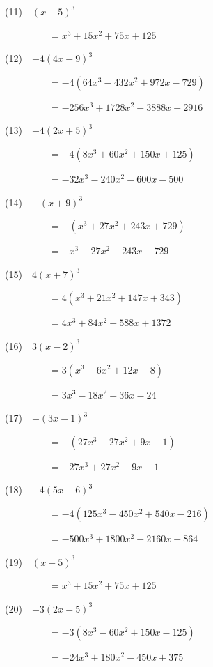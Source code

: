 \documentclass[a4j,twocolumn,10pt,fleqn]{jarticle}
\begin{document}
(11)~~$\left(x + 5\right)^{3}$

~~~~~~~~~$=x^{3} + 15 x^{2} + 75 x + 125$

(12)~~$-4\left(4 x - 9\right)^{3}$

~~~~~~~~~$=-4(64 x^{3} - 432 x^{2} + 972 x - 729)$

~~~~~~~~~$=- 256 x^{3} + 1728 x^{2} - 3888 x + 2916$

(13)~~$-4\left(2 x + 5\right)^{3}$

~~~~~~~~~$=-4(8 x^{3} + 60 x^{2} + 150 x + 125)$

~~~~~~~~~$=- 32 x^{3} - 240 x^{2} - 600 x - 500$

(14)~~$-\left(x + 9\right)^{3}$

~~~~~~~~~$=-(x^{3} + 27 x^{2} + 243 x + 729)$

~~~~~~~~~$=- x^{3} - 27 x^{2} - 243 x - 729$

(15)~~$4\left(x + 7\right)^{3}$

~~~~~~~~~$=4(x^{3} + 21 x^{2} + 147 x + 343)$

~~~~~~~~~$=4 x^{3} + 84 x^{2} + 588 x + 1372$

(16)~~$3\left(x - 2\right)^{3}$

~~~~~~~~~$=3(x^{3} - 6 x^{2} + 12 x - 8)$

~~~~~~~~~$=3 x^{3} - 18 x^{2} + 36 x - 24$

(17)~~$-\left(3 x - 1\right)^{3}$

~~~~~~~~~$=-(27 x^{3} - 27 x^{2} + 9 x - 1)$

~~~~~~~~~$=- 27 x^{3} + 27 x^{2} - 9 x + 1$

(18)~~$-4\left(5 x - 6\right)^{3}$

~~~~~~~~~$=-4(125 x^{3} - 450 x^{2} + 540 x - 216)$

~~~~~~~~~$=- 500 x^{3} + 1800 x^{2} - 2160 x + 864$

(19)~~$\left(x + 5\right)^{3}$

~~~~~~~~~$=x^{3} + 15 x^{2} + 75 x + 125$

(20)~~$-3\left(2 x - 5\right)^{3}$

~~~~~~~~~$=-3(8 x^{3} - 60 x^{2} + 150 x - 125)$

~~~~~~~~~$=- 24 x^{3} + 180 x^{2} - 450 x + 375$
\end{document}
